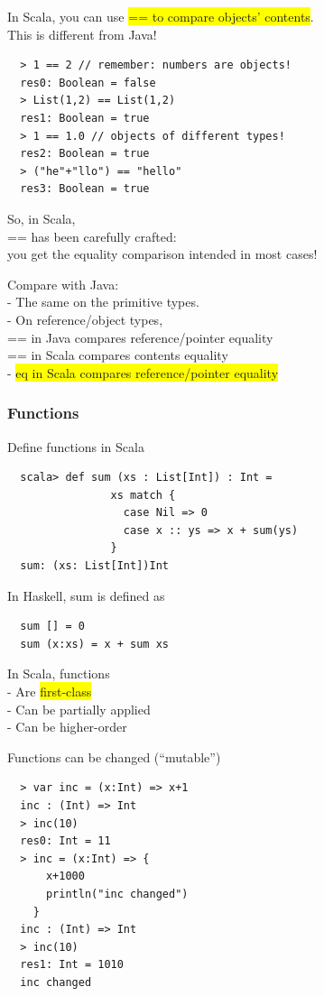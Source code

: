 \documentclass[tikz,border=10pt]{project_plan}
\begin{document}
In Scala, you can use \colorbox{yellow}{== to compare objects' contents}.\\
This is different from Java!
\begin{lstlisting}
  > 1 == 2 // remember: numbers are objects!
  res0: Boolean = false
  > List(1,2) == List(1,2)
  res1: Boolean = true
  > 1 == 1.0 // objects of different types!
  res2: Boolean = true
  > ("he"+"llo") == "hello"
  res3: Boolean = true
\end{lstlisting}

So, in Scala,\\
== has been carefully crafted:\\
you get the equality comparison intended in most cases!

Compare with Java:\\
- The same on the primitive types.\\
- On reference/object types,\\
== in Java compares reference/pointer equality\\
== in Scala compares contents equality\\
- \colorbox{yellow}{eq in Scala compares reference/pointer equality}

\subsubsection{Functions}

Define functions in Scala
\begin{lstlisting}
  scala> def sum (xs : List[Int]) : Int =
                xs match {
                  case Nil => 0
                  case x :: ys => x + sum(ys)
                }
  sum: (xs: List[Int])Int
\end{lstlisting}
In Haskell, sum is defined as
\begin{lstlisting}
  sum [] = 0
  sum (x:xs) = x + sum xs
\end{lstlisting}

In Scala, functions\\
- Are \colorbox{yellow}{first-class}\\
- Can be partially applied\\
- Can be higher-order

Functions can be changed (“mutable”)
\begin{lstlisting}
  > var inc = (x:Int) => x+1
  inc : (Int) => Int
  > inc(10)
  res0: Int = 11
  > inc = (x:Int) => {
      x+1000
      println("inc changed")
    }
  inc : (Int) => Int
  > inc(10)
  res1: Int = 1010
  inc changed
\end{lstlisting}
\end{document}
